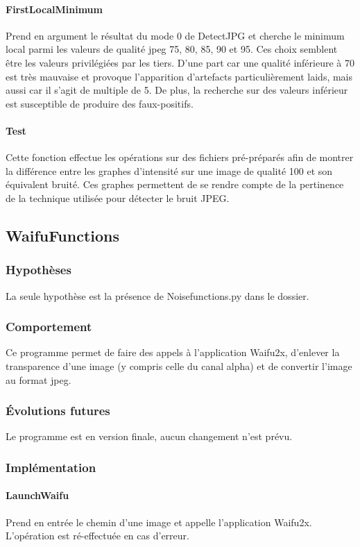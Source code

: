 \documentclass[a4paper,12pt]{article}
\begin{document}
\paragraph{FirstLocalMinimum}
Prend en argument le résultat du mode 0 de DetectJPG et cherche le minimum local parmi les valeurs de qualité jpeg 75, 80, 85, 90 et 95. Ces choix semblent être les valeurs privilégiées par les tiers. D'une part car une qualité inférieure à 70 est très mauvaise et provoque l'apparition d'artefacts particulièrement laids, mais aussi car il s'agit de multiple de 5. De plus, la recherche sur des valeurs inférieur est susceptible de produire des faux-positifs.

\paragraph{Test}
Cette fonction effectue les opérations sur des fichiers pré-préparés afin de montrer la différence entre les graphes d'intensité sur une image de qualité 100 et son équivalent bruité. Ces graphes permettent de se rendre compte de la pertinence de la technique utilisée pour détecter le bruit JPEG. 

\subsection{WaifuFunctions}
\subsubsection{Hypothèses}
La seule hypothèse est la présence de Noisefunctions.py dans le dossier.
\subsubsection{Comportement}
Ce programme permet de faire des appels à l'application Waifu2x, d'enlever la transparence d'une image (y compris celle du canal alpha) et de convertir l'image au format jpeg.
\subsubsection{Évolutions futures}
Le programme est en version finale, aucun changement n'est prévu.
\subsubsection{Implémentation}
\paragraph{LaunchWaifu}
Prend en entrée le chemin d'une image et appelle l'application Waifu2x. L'opération est ré-effectuée en cas d'erreur. 
\end{document}
